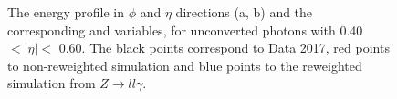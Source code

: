 \begin{figure}[htbp]
	\begin{tcolorbox}[colback=black!5!white,colframe=white!75!black]
    \caption{The energy profile in $\phi$ and $\eta$ directions (a, b) and the corresponding \Rphi and \Reta variables, for unconverted photons with 0.40 $ < |\eta| < $ 0.60. The black points correspond to Data 2017, red points to non-reweighted simulation and blue points to the reweighted simulation from $Z\rightarrow ll\gamma$.}
    \label{fig:gamma:ss:reweighting:photon:electron}
    \end{tcolorbox}
\end{figure}

